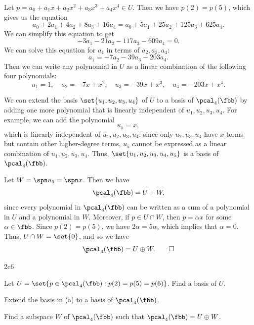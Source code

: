 \begin{solenum}
    \item Let $p = a_0 + a_1 x + a_2 x^2 + a_3 x^3 + a_4 x^4 \in U$.
	Then we have $p(2) = p(5)$, which gives us the equation
    \[
    	a_0 + 2a_1 + 4a_2 + 8a_3 + 16a_4 = a_0 + 5a_1 + 25a_2 + 125a_3 + 625a_4.
    \]
    We can simplify this equation to get
    \[
    	-3a_1 - 21a_2 - 117a_3 - 609a_4 = 0.
    \]
    We can solve this equation for $a_1$ in terms of $a_2, a_3, a_4$:
    \[
    	a_1 = -7a_2 - 39a_3 - 203a_4.
    \]
    Then we can write any polynomial in $U$ as a linear combination of the following four polynomials:
    \[
    	u_1 = 1, \quad u_2 = -7x + x^2, \quad u_3 = -39x + x^3, \quad u_4 = -203x + x^4.
    \]
    \item We can extend the basis $\set{u_1, u_2, u_3, u_4}$ of $U$ to a basis of $\pcal_4(\fbb)$ by adding one more polynomial that is linearly independent of $u_1, u_2, u_3, u_4$.
	For example, we can add the polynomial
    \[
    	u_5 = x,
    \]
    which is linearly independent of $u_1, u_2, u_3, u_4$: since only $u_2, u_3, u_4$ have $x$ terms but contain other higher-degree terms, $u_5$ cannot be expressed as a linear combination of $u_1, u_2, u_3, u_4$.
	Thus, $\set{u_1, u_2, u_3, u_4, u_5}$ is a basis of $\pcal_4(\fbb)$.
    \item Let $W = \spn u_5 = \spn x$.
	Then we have
    \[
    	\pcal_4(\fbb) = U + W,
    \]
    since every polynomial in $\pcal_4(\fbb)$ can be written as a sum of a polynomial in $U$ and a polynomial in $W$.
	Moreover, if $p \in U \cap W$, then $p = \alpha x$ for some $\alpha \in \fbb$.
	Since $p(2) = p(5)$, we have $2\alpha = 5\alpha$, which implies that $\alpha = 0$.
	Thus, $U \cap W = \set{0}$, and so we have
    \[
    	\pcal_4(\fbb) = U \oplus W. \qedhere
    \]
\end{solenum}

\begin{exercise}{2c6}
    \begin{subexercises}
        \item Let $U = \set{p \in \pcal_4(\fbb) : p(2) = p(5) = p(6)}$.
	Find a basis of $U$.
        \item Extend the basis in (a) to a basis of $\pcal_4(\fbb)$.
        \item Find a subspace $W$ of $\pcal_4(\fbb)$ such that $\pcal_4(\fbb) = U \oplus W$.
    \end{subexercises}
\end{exercise}

